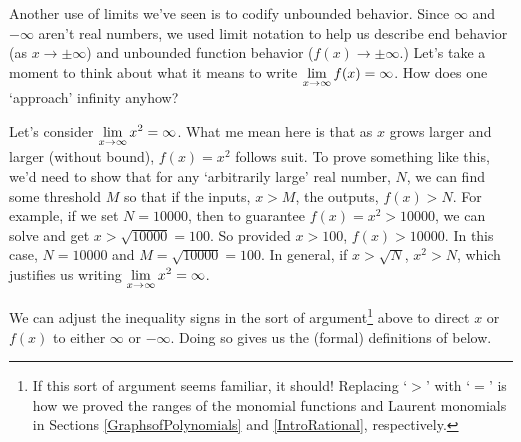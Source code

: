 Another use of limits we've seen is to codify unbounded behavior.  Since $\infty$ and $-\infty$ aren't real numbers,  we used limit notation to help us describe end behavior  (as $x \rightarrow \pm \infty$) and unbounded function behavior ($f(x)\rightarrow \pm \infty$.)  Let's take a moment to think about what it means to write $\displaystyle{\lim_{x \rightarrow \infty} f(x) = \infty}$.  How does one `approach' infinity anyhow?  

\medskip

Let's consider  $\displaystyle{\lim_{x \rightarrow \infty} x^2 = \infty}$.  What me mean here is that as $x$ grows larger and larger (without bound), $f(x) = x^2$ follows suit.  To prove something like this, we'd need to show that for any `arbitrarily large' real number, $N$, we can find some threshold $M$ so that if the inputs, $x>M$, the outputs, $f(x) > N$.  For example, if we set $N = 10000$, then to guarantee $f(x) = x^2 > 10000$, we can solve and get $x > \sqrt{10000} = 100$.  So provided $x > 100$, $f(x) > 10000$.  In this case, $N = 10000$ and $M = \sqrt{10000} = 100$.  In general, if $x > \sqrt{N}$, $x^2 > N$, which justifies us writing $\displaystyle{\lim_{x \rightarrow \infty} x^2 = \infty}$.

\medskip

We can adjust the inequality signs in the sort of argument\footnote{If this sort of argument seems familiar, it should!  Replacing `$>$' with `$=$' is how we proved the ranges  of the monomial functions and Laurent monomials  in Sections \ref{GraphsofPolynomials} and \ref{IntroRational}, respectively.}   above to direct $x$ or $f(x)$ to either $\infty$ or $-\infty$.  Doing so gives us the (formal) definitions of below.

\medskip


